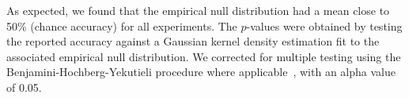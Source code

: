 As expected, we found that the empirical null distribution had a mean close to 50\% (chance accuracy) for all experiments. The $p$-values were obtained by testing the reported accuracy against a Gaussian kernel density estimation fit to the associated empirical null distribution. We corrected for multiple testing using the Benjamini-Hochberg-Yekutieli procedure where applicable~\cite{benjamini2001control}, with an alpha value of 0.05.
